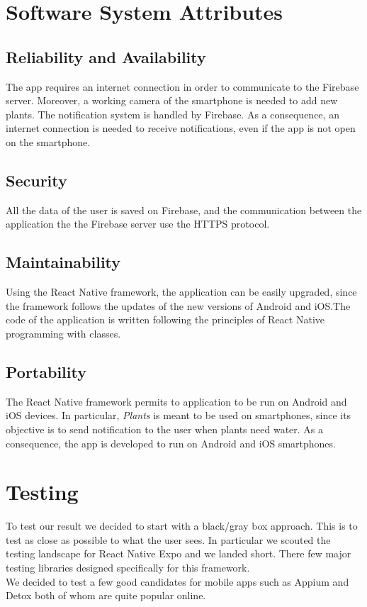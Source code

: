 \documentclass[10pt]{article}
\begin{document}
	\section{Software System Attributes}
	\subsection{Reliability and Availability}
	The app requires an internet connection in order to communicate to the Firebase server. Moreover, a working camera of the smartphone is needed to add new plants. The notification system is handled by Firebase. As a consequence, an internet connection is needed to receive notifications, even if the app is not open on the smartphone. 
	\subsection{Security}
	All the data of the user is saved on Firebase, and the communication between the application the the Firebase server use the HTTPS protocol. 
	\subsection{Maintainability}
	Using the React Native framework, the application can be easily upgraded, since the framework follows the updates of the new versions of Android and iOS.The code of the application is written following the principles of React Native programming with classes. 
	\subsection{Portability}
	The React Native framework permits to application to be run on Android and iOS devices. In particular, \textit{Plants} is meant to be used on smartphones, since its objective is to send notification to the user when plants need water. As a consequence, the app is developed to run on Android and iOS smartphones.
    
    \section{Testing}
    To test our result we decided to start with a black/gray box approach. This is to test as close as possible to what the user sees. In particular we scouted the testing landscape for React Native Expo and we landed short. There few major testing libraries designed specifically for this framework. \\
    We decided to test a few good candidates for mobile apps such as Appium and Detox both of whom are quite popular online.
\end{document}
